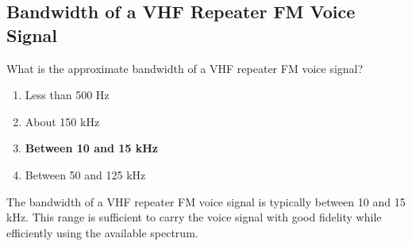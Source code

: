 \subsection{Bandwidth of a VHF Repeater FM Voice Signal}
\label{T8A09}

\begin{tcolorbox}[colback=gray!10!white,colframe=black!75!black,title=T8A09]
What is the approximate bandwidth of a VHF repeater FM voice signal?
\begin{enumerate}[noitemsep]
    \item Less than 500 Hz
    \item About 150 kHz
    \item \textbf{Between 10 and 15 kHz}
    \item Between 50 and 125 kHz
\end{enumerate}
\end{tcolorbox}

The bandwidth of a VHF repeater FM voice signal is typically between 10 and 15 kHz. This range is sufficient to carry the voice signal with good fidelity while efficiently using the available spectrum.